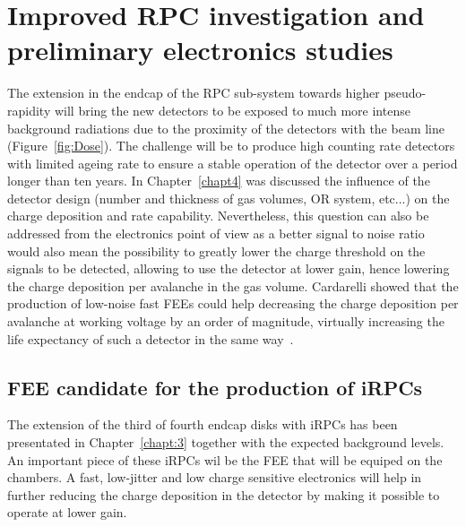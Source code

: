 \renewcommand\evenpagerightmark{{\scshape\small Chapter 6}}
\renewcommand\oddpageleftmark{{\scshape\small Improved RPC investigation and preliminary electronics studies}}

\renewcommand{\bibname}{References}

\hyphenation{}

\chapter[Improved RPC investigation and preliminary electronics studies]%
{Improved RPC investigation and preliminary electronics studies}
\label{chapt6}

	The extension in the endcap of the RPC sub-system towards higher pseudo-rapidity will bring the new detectors to be exposed to much more intense background radiations due to the proximity of the detectors with the beam line (Figure~\ref{fig:Dose}). The challenge will be to produce high counting rate detectors with limited ageing rate to ensure a stable operation of the detector over a period longer than ten years. In Chapter~\ref{chapt4} was discussed the influence of the detector design (number and thickness of gas volumes, OR system, etc...) on the charge deposition and rate capability. Nevertheless, this question can also be addressed from the electronics point of view as a better signal to noise ratio would also mean the possibility to greatly lower the charge threshold on the signals to be detected, allowing to use the detector at lower gain, hence lowering the charge deposition per avalanche in the gas volume. Cardarelli showed that the production of low-noise fast FEEs could help decreasing the charge deposition per avalanche at working voltage by an order of magnitude, virtually increasing the life expectancy of such a detector in the same way~\cite{CARDARELLI2012}.

\section{FEE candidate for the production of iRPCs}
\label{chapt6:sec:candidates}

	The extension of the third of fourth endcap disks with \acl{iRPC}s has been presentated in Chapter~\ref{chapt:3} together with the expected background levels. An important piece of these iRPCs wil be the \acl{FEE} that will be equiped on the chambers. A fast, low-jitter and low charge sensitive electronics will help in further reducing the charge deposition in the detector by making it possible to operate at lower gain.
	
